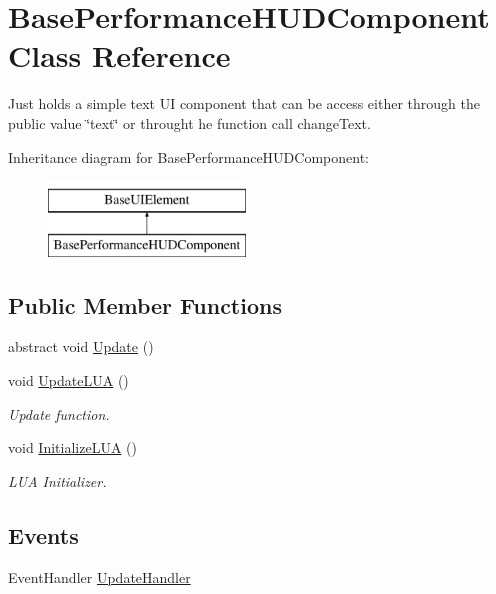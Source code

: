 \hypertarget{class_base_performance_h_u_d_component}{}\section{Base\+Performance\+H\+U\+D\+Component Class Reference}
\label{class_base_performance_h_u_d_component}


Just holds a simple text UI component that can be access either through the public value \char`\"{}text\char`\"{} or throught he function call change\+Text.  


Inheritance diagram for Base\+Performance\+H\+U\+D\+Component\+:\begin{figure}[H]
\begin{center}
\leavevmode
\includegraphics[height=2.000000cm]{class_base_performance_h_u_d_component}
\end{center}
\end{figure}
\subsection*{Public Member Functions}
\begin{DoxyCompactItemize}
\item 
abstract void \hyperlink{class_base_performance_h_u_d_component_a7a585b4c22bd5b3daee51bf126fa1cec}{Update} ()
\item 
void \hyperlink{class_base_performance_h_u_d_component_a1bfc49c6f269efdebc7dd3ae20e7e998}{Update\+L\+UA} ()
\begin{DoxyCompactList}\small\item\em Update function. \end{DoxyCompactList}\item 
void \hyperlink{class_base_performance_h_u_d_component_a96a35c9abee1fe9f275b906bfdbdeec2}{Initialize\+L\+UA} ()
\begin{DoxyCompactList}\small\item\em L\+UA Initializer. \end{DoxyCompactList}\end{DoxyCompactItemize}
\subsection*{Events}
\begin{DoxyCompactItemize}
\item 
Event\+Handler \hyperlink{class_base_performance_h_u_d_component_aa1b8ecde232b11e47d40961411b2ded5}{Update\+Handler}
\end{DoxyCompactItemize}
